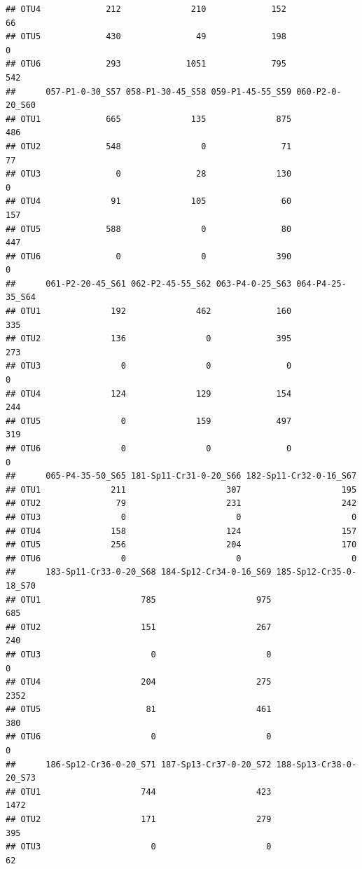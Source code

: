 \documentclass[]{article}
\begin{document}
\begin{verbatim}
## OTU4             212              210             152               66
## OTU5             430               49             198                0
## OTU6             293             1051             795              542
##      057-P1-0-30_S57 058-P1-30-45_S58 059-P1-45-55_S59 060-P2-0-20_S60
## OTU1             665              135              875             486
## OTU2             548                0               71              77
## OTU3               0               28              130               0
## OTU4              91              105               60             157
## OTU5             588                0               80             447
## OTU6               0                0              390               0
##      061-P2-20-45_S61 062-P2-45-55_S62 063-P4-0-25_S63 064-P4-25-35_S64
## OTU1              192              462             160              335
## OTU2              136                0             395              273
## OTU3                0                0               0                0
## OTU4              124              129             154              244
## OTU5                0              159             497              319
## OTU6                0                0               0                0
##      065-P4-35-50_S65 181-Sp11-Cr31-0-20_S66 182-Sp11-Cr32-0-16_S67
## OTU1              211                    307                    195
## OTU2               79                    231                    242
## OTU3                0                      0                      0
## OTU4              158                    124                    157
## OTU5              256                    204                    170
## OTU6                0                      0                      0
##      183-Sp11-Cr33-0-20_S68 184-Sp12-Cr34-0-16_S69 185-Sp12-Cr35-0-18_S70
## OTU1                    785                    975                    685
## OTU2                    151                    267                    240
## OTU3                      0                      0                      0
## OTU4                    204                    275                   2352
## OTU5                     81                    461                    380
## OTU6                      0                      0                      0
##      186-Sp12-Cr36-0-20_S71 187-Sp13-Cr37-0-20_S72 188-Sp13-Cr38-0-20_S73
## OTU1                    744                    423                   1472
## OTU2                    171                    279                    395
## OTU3                      0                      0                     62

\end{verbatim}
\end{document}

